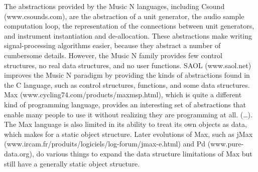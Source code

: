 \begin{citacao}
{
The abstractions provided by the Music N languages, including Csound (www.csounds.com), are the abstraction of a unit generator, the audio sample computation loop, the representation of the connections between unit generators, and instrument instantiation and de-allocation. These abstractions make writing signal-processing algorithms easier, because they abstract a number of cumbersome details. However, the Music N family provides few control structures, no real data structures, and no user functions. SAOL (www.saol.net) improves the Music N paradigm by providing the kinds of abstractions found in the C language, such as control structures, functions, and some data structures. Max (www.cycling74.com/products/maxmsp.html), which is quite a different kind of programming language, provides an interesting set of abstractions that enable many people to use it
without realizing they are programming at all. (\ldots). The Max language is also limited in its ability to treat its own objects as data, which makes for a static object structure. Later evolutions of Max, such as jMax (www.ircam.fr/produits/logiciels/log-forum/jmax-e.html) and Pd (www.pure-data.org), do various things to expand the data structure limitations of Max but still have a generally static object structure.
}
\end{citacao}

